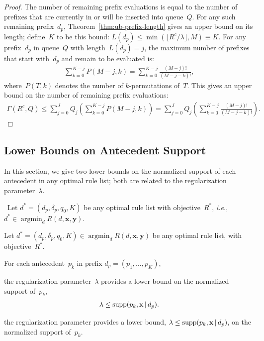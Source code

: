 \documentclass[twoside,11pt]{article}
\def\ie{{\it i.e.},~}
\newcommand{\x}{\mathbf{x}}
\newcommand{\y}{\mathbf{y}}
\def\RL{{d}}
\def\Prefix{d_p}
\def\Labels{\delta_p}
\def\Default{q_0}
\def\Obj{R}
\def\Reg{{\lambda}}
\def\Supp{\textnormal{supp}}
\def\CurrentObj{{R^c}}
\def\OptimalObj{R^*}
\def\OptimalRL{d^*}
\def\Remaining{\Gamma}
\def\Queue{Q}
\DeclareMathOperator*{\argmin}{argmin}
\newcommand{\nn}{\nonumber}
\newcommand{\given}{\,|\,}
\begin{document}
\begin{arxiv}
\begin{proof}
The number of remaining prefix evaluations is equal to the number of
prefixes that are currently in or will be inserted into queue~$\Queue$.
%
For any such remaining prefix~$\Prefix$,
Theorem~\ref{thm:ub-prefix-length} gives an upper bound on its length;
define~$K$ to be this bound:
${L(\Prefix) \le \min(\lfloor \CurrentObj / \Reg \rfloor, M) \equiv K}$.
%
For any prefix~$\Prefix$ in queue~$\Queue$ with length~${L(\Prefix) = j}$,
the maximum number of prefixes that start with~$\Prefix$
and remain to be evaluated is:
\begin{align}
\sum_{k=0}^{K-j} P(M-j, k) = \sum_{k=0}^{K-j} \frac{(M-j)!}{(M-j - k)!}, \nn
\end{align}
where~${P(T, k)}$ denotes the number of $k$-permutations of~$T$.
%
This gives an upper bound on the number of remaining prefix evaluations:
\begin{align}
\Remaining(\CurrentObj, \Queue)
\le \sum_{j=0}^J \Queue_j \left( \sum_{k=0}^{K-j} P(M-j, k) \right)
= \sum_{j=0}^J \Queue_j \left( \sum_{k=0}^{K-j} \frac{(M-j)!}{(M-j - k)!} \right). \nn
\end{align}
\end{proof}
\end{arxiv}

\subsection{Lower Bounds on Antecedent Support}
\label{sec:lb-support}

In this section, we give two lower bounds on the normalized support
of each antecedent in any optimal rule list;
both are related to the regularization parameter~$\Reg$.

\begin{theorem}
\label{thm:min-capture}
\begin{arxiv}
~Let ${\OptimalRL = (\Prefix, \Labels, \Default, K)}$
be any optimal rule list with objective~$\OptimalObj$, \ie
${\OptimalRL \in \argmin_\RL \Obj(\RL, \x, \y)}$.
\end{arxiv}
\begin{kdd}
Let ${\OptimalRL = (\Prefix, \Labels, \Default, K) \in \argmin_\RL \Obj(\RL, \x, \y)}$
be any optimal rule list, with objective~$\OptimalObj$.
\end{kdd}
For each antecedent~$p_k$ in prefix ${\Prefix = (p_1, \dots, p_K)}$,
\begin{arxiv}
the regularization parameter~$\Reg$ provides a lower bound
on the normalized support of~$p_k$,
\begin{align}
\Reg \le \Supp(p_k, \x \given \Prefix).
\label{eq:min-capture}
\end{align}
\end{arxiv}
\begin{kdd}
the regularization parameter provides a lower bound,
${\Reg \le \Supp(p_k, \x \given \Prefix)}$, on the normalized support of~$p_k$.
\end{kdd}
\end{theorem}
\end{document}
